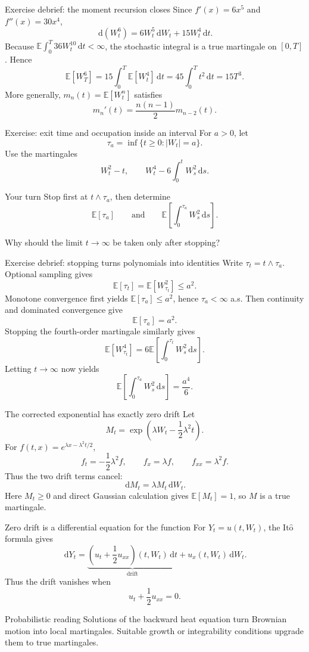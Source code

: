 \documentclass[handout,10pt,aspectratio=169]{beamer}
\newcommand{\E}{\mathbb E}
\newcommand{\dd}{\,\mathrm d}
\newcommand{\Ito}{\mathrm{It\hat{o}}}
\begin{document}
\begin{frame}{Exercise debrief: the moment recursion closes}
Since \(f'(x)=6x^5\) and \(f''(x)=30x^4\),
\[
\dd(W_t^6)=6W_t^5\dd W_t+15W_t^4\dd t.
\]
Because \(\E\int_0^T36W_t^{10}\dd t<\infty\), the stochastic integral is a true martingale on \([0,T]\). Hence
\[
\boxed{
\E[W_T^6]
=15\int_0^T\E[W_t^4]\dd t
=45\int_0^Tt^2\dd t
=15T^3.}
\]
More generally, \(m_n(t)=\E[W_t^n]\) satisfies
\[
m_n'(t)=\frac{n(n-1)}2m_{n-2}(t).
\]
\end{frame}

\begin{frame}{Exercise: exit time and occupation inside an interval}
For \(a>0\), let
\[
\tau_a=\inf\{t\ge0:|W_t|=a\}.
\]
Use the martingales
\[
W_t^2-t,
\qquad
W_t^4-6\int_0^tW_s^2\dd s.
\]
\begin{block}{Your turn}
Stop first at \(t\wedge\tau_a\), then determine
\[
\E[\tau_a]
\qquad\text{and}\qquad
\E\!\left[\int_0^{\tau_a}W_s^2\dd s\right].
\]
\end{block}
Why should the limit \(t\to\infty\) be taken only after stopping?
\end{frame}

\begin{frame}{Exercise debrief: stopping turns polynomials into identities}
Write \(\tau_t=t\wedge\tau_a\). Optional sampling gives
\[
\E[\tau_t]=\E[W_{\tau_t}^2]\le a^2.
\]
Monotone convergence first yields \(\E[\tau_a]\le a^2\), hence \(\tau_a<\infty\) a.s. Then continuity and dominated convergence give
\[
\boxed{\E[\tau_a]=a^2.}
\]
Stopping the fourth-order martingale similarly gives
\[
\E[W_{\tau_t}^4]
=6\E\!\left[\int_0^{\tau_t}W_s^2\dd s\right].
\]
Letting \(t\to\infty\) now yields
\[
\boxed{\E\!\left[\int_0^{\tau_a}W_s^2\dd s\right]=\frac{a^4}{6}.}
\]
\end{frame}

\begin{frame}{The corrected exponential has exactly zero drift}
Let
\[
M_t=\exp\left(\lambda W_t-\frac12\lambda^2t\right).
\]
For \(f(t,x)=e^{\lambda x-\lambda^2t/2}\),
\[
f_t=-\frac12\lambda^2f,
\qquad f_x=\lambda f,
\qquad f_{xx}=\lambda^2f.
\]
Thus the two drift terms cancel:
\[
\boxed{\dd M_t=\lambda M_t\dd W_t.}
\]
Here \(M_t\ge0\) and direct Gaussian calculation gives \(\E[M_t]=1\), so \(M\) is a true martingale.
\end{frame}

\begin{frame}{Zero drift is a differential equation for the function}
For \(Y_t=u(t,W_t)\), the \(\Ito\) formula gives
\[
\dd Y_t
=\underbrace{\left(u_t+\frac12u_{xx}\right)(t,W_t)\dd t}_{\text{drift}}
+u_x(t,W_t)\dd W_t.
\]
Thus the drift vanishes when
\[
\boxed{u_t+\frac12u_{xx}=0.}
\]
\begin{block}{Probabilistic reading}
Solutions of the backward heat equation turn Brownian motion into local martingales. Suitable growth or integrability conditions upgrade them to true martingales.
\end{block}
\end{frame}
\end{document}
